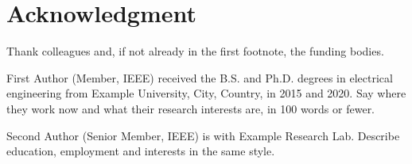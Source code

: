 \documentclass[journal]{IEEEtran}
\begin{document}
\section*{Acknowledgment}
Thank colleagues and, if not already in the first footnote, the funding bodies.




{First Author}
(Member, IEEE) received the B.S. and Ph.D. degrees in electrical engineering from
Example University, City, Country, in 2015 and 2020. Say where they work now and what
their research interests are, in 100 words or fewer.
\end{IEEEbiography}

\begin{IEEEbiographynophoto}{Second Author}
(Senior Member, IEEE) is with Example Research Lab. Describe education, employment and
interests in the same style.
\end{IEEEbiographynophoto}
\end{document}
